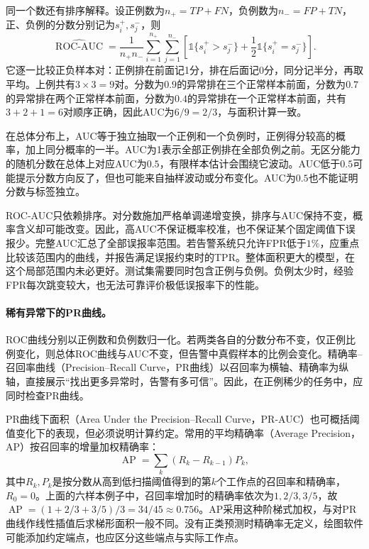 同一个数还有排序解释。设正例数为$n_+=TP+FN$，负例数为$n_-=FP+TN$，正、负例的分数分别记为$s_i^+,s_j^-$，则
\begin{equation}
 \widehat{\operatorname{ROC\text{-}AUC}}
 =\frac{1}{n_+n_-}\sum_{i=1}^{n_+}\sum_{j=1}^{n_-}
 \left[\mathbb 1\{s_i^+>s_j^-\}
 +\frac12\mathbb 1\{s_i^+=s_j^-\}\right].
 \label{eq:classification-auc-pairs}
\end{equation}
它逐一比较正负样本对：正例排在前面记1分，排在后面记0分，同分记半分，再取平均。上例共有$3\times3=9$对。分数为$0.9$的异常排在三个正常样本前面，分数为$0.7$的异常排在两个正常样本前面，分数为$0.4$的异常排在一个正常样本前面，共有$3+2+1=6$对顺序正确，因此AUC为$6/9=2/3$，与面积计算一致。

在总体分布上，AUC等于独立抽取一个正例和一个负例时，正例得分较高的概率，加上同分概率的一半。AUC为1表示全部正例排在全部负例之前。无区分能力的随机分数在总体上对应AUC为$0.5$，有限样本估计会围绕它波动。AUC低于$0.5$可能提示分数方向反了，但也可能来自抽样波动或分布变化。AUC为$0.5$也不能证明分数与标签独立。

ROC-AUC只依赖排序。对分数施加严格单调递增变换，排序与AUC保持不变，概率含义却可能改变。因此，高AUC不保证概率校准，也不保证某个固定阈值下误报少。完整AUC汇总了全部误报率范围。若告警系统只允许FPR低于$1\%$，应重点比较该范围内的曲线，并报告满足误报约束时的TPR。整体面积更大的模型，在这个局部范围内未必更好。测试集需要同时包含正例与负例。负例太少时，经验FPR每次跳变较大，也无法可靠评价极低误报率下的性能。

\paragraph{稀有异常下的PR曲线。}
ROC曲线分别以正例数和负例数归一化。若两类各自的分数分布不变，仅正例比例变化，则总体ROC曲线与AUC不变，但告警中真假样本的比例会变化。精确率--召回率曲线（Precision--Recall Curve，PR曲线）以召回率为横轴、精确率为纵轴，直接展示“找出更多异常时，告警有多可信”。因此，在正例稀少的任务中，应同时检查PR曲线。

PR曲线下面积（Area Under the Precision--Recall Curve，PR-AUC）也可概括阈值变化下的表现，但必须说明计算约定。常用的平均精确率（Average Precision，AP）按召回率的增量加权精确率：
\begin{equation}
 \operatorname{AP}=\sum_k(R_k-R_{k-1})P_k,
 \label{eq:classification-average-precision}
\end{equation}
其中$R_k,P_k$是按分数从高到低扫描阈值得到的第$k$个工作点的召回率和精确率，$R_0=0$。上面的六样本例子中，召回率增加时的精确率依次为$1,2/3,3/5$，故$\operatorname{AP}=(1+2/3+3/5)/3=34/45\approx0.756$。AP采用这种阶梯式加权，与对PR曲线作线性插值后求梯形面积一般不同。没有正类预测时精确率无定义，绘图软件可能添加约定端点，也应区分这些端点与实际工作点。


